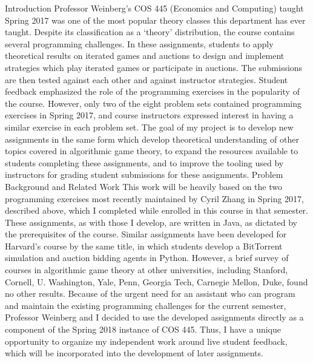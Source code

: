 \documentclass[pageno]{jpaper}
\begin{document}
Introduction    
Professor Weinberg’s COS 445 (Economics and Computing) taught Spring 2017 was one of the most popular theory classes this department has ever taught. Despite its classification as a ‘theory’ distribution, the course contains several programming challenges. In these assignments, students to apply theoretical results on iterated games and auctions to design and implement strategies which play iterated games or participate in auctions. The submissions are then tested against each other and against instructor strategies. Student feedback emphasized the role of the programming exercises in the popularity of the course. However, only two of the eight problem sets contained programming exercises in Spring 2017, and course instructors expressed interest in having a similar exercise in each problem set. The goal of my project is to develop new assignments in the same form which develop theoretical understanding of other topics covered in algorithmic game theory, to expand the resources available to students completing these assignments, and to improve the tooling used by instructors for grading student submissions for these assignments. 
Problem Background and Related Work
This work will be heavily based on the two programming exercises most recently maintained by Cyril Zhang in Spring 2017, described above, which I completed while enrolled in this course in that semester. These assignments, as with those I develop, are written in Java, as dictated by the prerequisites of the course. Similar assignments have been developed for Harvard’s course by the same title, in which students develop a BitTorrent simulation and auction bidding agents in Python. However, a brief survey of courses in algorithmic game theory at other universities, including Stanford, Cornell, U. Washington, Yale, Penn, Georgia Tech, Carnegie Mellon, Duke, found no other results.
    Because of the urgent need for an assistant who can program and maintain the existing programming challenges for the current semester, Professor Weinberg and I decided to use the developed assignments directly as a component of the Spring 2018 instance of COS 445. Thus, I have a unique opportunity to organize my independent work around live student feedback, which will be incorporated into the development of later assignments.
\end{document}
